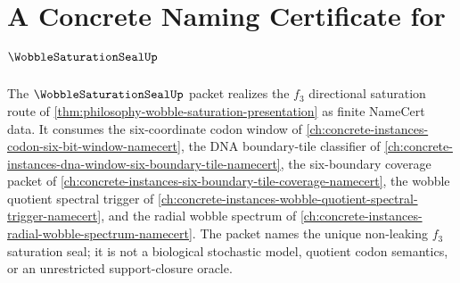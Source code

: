 \chapter{A Concrete Naming Certificate for $\WobbleSaturationSealUp$}
\label{ch:concrete-instances-wobble-saturation-seal-namecert}

The $\WobbleSaturationSealUp$ packet realizes the $f_{3}$ directional saturation route of \autoref{thm:philosophy-wobble-saturation-presentation} as finite NameCert data. It consumes the six-coordinate codon window of \autoref{ch:concrete-instances-codon-six-bit-window-namecert}, the DNA boundary-tile classifier of \autoref{ch:concrete-instances-dna-window-six-boundary-tile-namecert}, the six-boundary coverage packet of \autoref{ch:concrete-instances-six-boundary-tile-coverage-namecert}, the wobble quotient spectral trigger of \autoref{ch:concrete-instances-wobble-quotient-spectral-trigger-namecert}, and the radial wobble spectrum of \autoref{ch:concrete-instances-radial-wobble-spectrum-namecert}. The packet names the unique non-leaking $f_{3}$ saturation seal; it is not a biological stochastic model, quotient codon semantics, or an unrestricted support-closure oracle.

